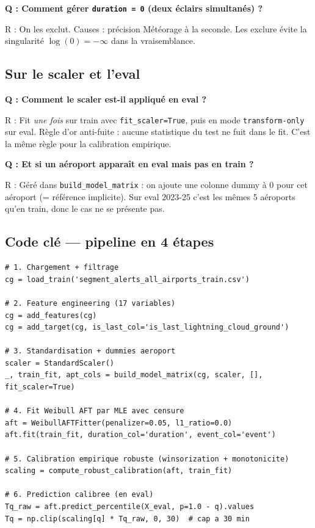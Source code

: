 \documentclass[11pt,a4paper]{article}
\begin{document}
\begin{piege}
\textbf{Q : Comment gérer \texttt{duration = 0} (deux éclairs simultanés) ?}

R : On les exclut. Causes : précision Météorage à la seconde. Les exclure évite la
singularité $\log(0) = -\infty$ dans la vraisemblance.
\end{piege}

\subsection*{Sur le scaler et l'eval}

\begin{piege}
\textbf{Q : Comment le scaler est-il appliqué en eval ?}

R : Fit \emph{une fois} sur train avec \texttt{fit\_scaler=True}, puis en mode
\texttt{transform-only} sur eval. Règle d'or anti-fuite : aucune statistique du test ne
fuit dans le fit. C'est la même règle pour la calibration empirique.
\end{piege}

\begin{piege}
\textbf{Q : Et si un aéroport apparaît en eval mais pas en train ?}

R : Géré dans \texttt{build\_model\_matrix} : on ajoute une colonne dummy à 0 pour cet
aéroport (= référence implicite). Sur eval 2023-25 c'est les mêmes 5 aéroports qu'en train,
donc le cas ne se présente pas.
\end{piege}

\subsection*{Code clé — pipeline en 4 étapes}

\begin{lstlisting}[caption={Pipeline complet (dans \texttt{meteorage\_model.py}).}]
# 1. Chargement + filtrage
cg = load_train('segment_alerts_all_airports_train.csv')

# 2. Feature engineering (17 variables)
cg = add_features(cg)
cg = add_target(cg, is_last_col='is_last_lightning_cloud_ground')

# 3. Standardisation + dummies aeroport
scaler = StandardScaler()
_, train_fit, apt_cols = build_model_matrix(cg, scaler, [], fit_scaler=True)

# 4. Fit Weibull AFT par MLE avec censure
aft = WeibullAFTFitter(penalizer=0.05, l1_ratio=0.0)
aft.fit(train_fit, duration_col='duration', event_col='event')

# 5. Calibration empirique robuste (winsorization + monotonicite)
scaling = compute_robust_calibration(aft, train_fit)

# 6. Prediction calibree (en eval)
Tq_raw = aft.predict_percentile(X_eval, p=1.0 - q).values
Tq = np.clip(scaling[q] * Tq_raw, 0, 30)  # cap a 30 min
\end{lstlisting}
\end{document}
